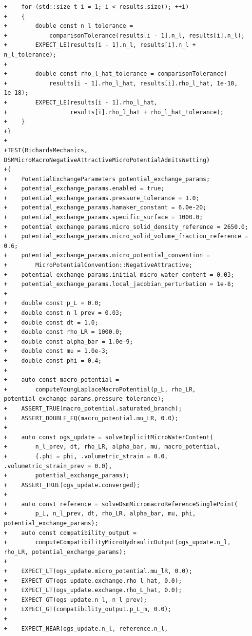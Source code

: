 \documentclass[10pt]{article}
\begin{document}
\begin{lstlisting}
+    for (std::size_t i = 1; i < results.size(); ++i)
+    {
+        double const n_l_tolerance =
+            comparisonTolerance(results[i - 1].n_l, results[i].n_l);
+        EXPECT_LE(results[i - 1].n_l, results[i].n_l + n_l_tolerance);
+
+        double const rho_l_hat_tolerance = comparisonTolerance(
+            results[i - 1].rho_l_hat, results[i].rho_l_hat, 1e-10, 1e-18);
+        EXPECT_LE(results[i - 1].rho_l_hat,
+                  results[i].rho_l_hat + rho_l_hat_tolerance);
+    }
+}
+
+TEST(RichardsMechanics, DSMMicroMacroNegativeAttractiveMicroPotentialAdmitsWetting)
+{
+    PotentialExchangeParameters potential_exchange_params;
+    potential_exchange_params.enabled = true;
+    potential_exchange_params.pressure_tolerance = 1.0;
+    potential_exchange_params.hamaker_constant = 6.0e-20;
+    potential_exchange_params.specific_surface = 1000.0;
+    potential_exchange_params.micro_solid_density_reference = 2650.0;
+    potential_exchange_params.micro_solid_volume_fraction_reference = 0.6;
+    potential_exchange_params.micro_potential_convention =
+        MicroPotentialConvention::NegativeAttractive;
+    potential_exchange_params.initial_micro_water_content = 0.03;
+    potential_exchange_params.local_jacobian_perturbation = 1e-8;
+
+    double const p_L = 0.0;
+    double const n_l_prev = 0.03;
+    double const dt = 1.0;
+    double const rho_LR = 1000.0;
+    double const alpha_bar = 1.0e-9;
+    double const mu = 1.0e-3;
+    double const phi = 0.4;
+
+    auto const macro_potential =
+        computeYoungLaplaceMacroPotential(p_L, rho_LR, potential_exchange_params.pressure_tolerance);
+    ASSERT_TRUE(macro_potential.saturated_branch);
+    ASSERT_DOUBLE_EQ(macro_potential.mu_LR, 0.0);
+
+    auto const ogs_update = solveImplicitMicroWaterContent(
+        n_l_prev, dt, rho_LR, alpha_bar, mu, macro_potential,
+        {.phi = phi, .volumetric_strain = 0.0, .volumetric_strain_prev = 0.0},
+        potential_exchange_params);
+    ASSERT_TRUE(ogs_update.converged);
+
+    auto const reference = solveDsmMicromacroReferenceSinglePoint(
+        p_L, n_l_prev, dt, rho_LR, alpha_bar, mu, phi, potential_exchange_params);
+    auto const compatibility_output =
+        computeCompatibilityMicroHydraulicOutput(ogs_update.n_l, rho_LR, potential_exchange_params);
+
+    EXPECT_LT(ogs_update.micro_potential.mu_lR, 0.0);
+    EXPECT_GT(ogs_update.exchange.rho_l_hat, 0.0);
+    EXPECT_LT(ogs_update.exchange.rho_L_hat, 0.0);
+    EXPECT_GT(ogs_update.n_l, n_l_prev);
+    EXPECT_GT(compatibility_output.p_L_m, 0.0);
+
+    EXPECT_NEAR(ogs_update.n_l, reference.n_l,

\end{lstlisting}
\end{document}
